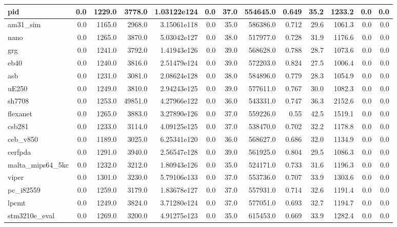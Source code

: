 \begin{tabular}{|l r r r r| r r r r r r | r r|}
\hline
pid & 0.0 & 1229.0 & 3778.0 & 1.03122e124 & 0.0 & 37.0 & 554645.0 & 0.649 & 35.2 & 1233.2 & 0.0 & 0.0 \\
\hline
am31\_sim & 0.0 & 1165.0 & 2968.0 & 3.15061e118 & 0.0 & 35.0 & 586386.0 & 0.712 & 29.6 & 1061.3 & 0.0 & 0.0 \\
\hline
nano & 0.0 & 1265.0 & 3870.0 & 5.03042e127 & 0.0 & 38.0 & 517977.0 & 0.728 & 31.9 & 1176.6 & 0.0 & 0.0 \\
\hline
grg & 0.0 & 1241.0 & 3792.0 & 1.41943e126 & 0.0 & 39.0 & 568628.0 & 0.788 & 28.7 & 1073.6 & 0.0 & 0.0 \\
\hline
eb40 & 0.0 & 1240.0 & 3816.0 & 2.51479e124 & 0.0 & 39.0 & 572203.0 & 0.824 & 27.5 & 1006.4 & 0.0 & 0.0 \\
\hline
asb & 0.0 & 1231.0 & 3081.0 & 2.08624e128 & 0.0 & 38.0 & 584896.0 & 0.779 & 28.3 & 1054.9 & 0.0 & 0.0 \\
\hline
uE250 & 0.0 & 1249.0 & 3810.0 & 2.94243e125 & 0.0 & 39.0 & 577611.0 & 0.767 & 30.0 & 1082.3 & 0.0 & 0.0 \\
\hline
sh7708 & 0.0 & 1253.0 & 49851.0 & 4.27966e122 & 0.0 & 36.0 & 543331.0 & 0.747 & 36.3 & 2152.6 & 0.0 & 0.0 \\
\hline
flexanet & 0.0 & 1265.0 & 3883.0 & 3.27890e126 & 0.0 & 37.0 & 559226.0 & 0.55 & 42.5 & 1519.1 & 0.0 & 0.0 \\
\hline
csb281 & 0.0 & 1233.0 & 3114.0 & 4.09125e125 & 0.0 & 37.0 & 538470.0 & 0.702 & 32.2 & 1178.8 & 0.0 & 0.0 \\
\hline
ceb\_v850 & 0.0 & 1189.0 & 3025.0 & 6.25341e120 & 0.0 & 36.0 & 568627.0 & 0.686 & 32.0 & 1134.9 & 0.0 & 0.0 \\
\hline
cerfpda & 0.0 & 1291.0 & 3940.0 & 2.56547e128 & 0.0 & 39.0 & 561925.0 & 0.804 & 29.5 & 1086.3 & 0.0 & 0.0 \\
\hline
malta\_mips64\_5kc & 0.0 & 1232.0 & 3212.0 & 1.80943e126 & 0.0 & 35.0 & 524171.0 & 0.733 & 31.6 & 1196.3 & 0.0 & 0.0 \\
\hline
viper & 0.0 & 1301.0 & 3230.0 & 5.79106e133 & 0.0 & 37.0 & 553736.0 & 0.707 & 33.9 & 1303.6 & 0.0 & 0.0 \\
\hline
pc\_i82559 & 0.0 & 1259.0 & 3179.0 & 1.83678e127 & 0.0 & 37.0 & 557931.0 & 0.714 & 32.6 & 1191.4 & 0.0 & 0.0 \\
\hline
lpcmt & 0.0 & 1249.0 & 3824.0 & 3.71280e124 & 0.0 & 37.0 & 577051.0 & 0.693 & 32.7 & 1194.7 & 0.0 & 0.0 \\
\hline
stm3210e\_eval & 0.0 & 1269.0 & 3200.0 & 4.91275e123 & 0.0 & 35.0 & 615453.0 & 0.669 & 33.9 & 1282.4 & 0.0 & 0.0 \\

\end{tabular}
